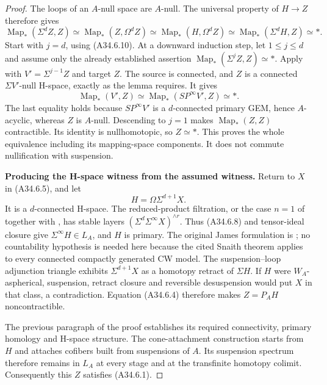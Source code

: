 \begin{proof}
The loops of an $A$-null space are $A$-null.  The universal
property of $H\to Z$ therefore gives
\[
 \operatorname{Map}_*(\Sigma^dZ,Z)
 \simeq\operatorname{Map}_*(Z,\Omega^dZ)
 \simeq\operatorname{Map}_*(H,\Omega^dZ)
 \simeq\operatorname{Map}_*(\Sigma^dH,Z)
 \simeq *.
 \tag{A34.6.10}
\]
Start with $j=d$, using \textup{(A34.6.10)}.  At a downward
induction step, let $1\leq j\leq d$ and assume only the already
established assertion
$\operatorname{Map}_*(\Sigma^jZ,Z)\simeq *$.  Apply \citet[Key Lemma~1.6]{ABousfield1996} with
$V'=\Sigma^{j-1}Z$ and target $Z$.
The source is connected, and $Z$ is a connected
$\Sigma V'$-null H-space, exactly as the lemma requires.
It gives
\[
 \operatorname{Map}_*(V',Z)
 \simeq\operatorname{Map}_*(SP^\infty V',Z)
 \simeq *.
 \tag{A34.6.11}
\]
The last equality holds because $SP^\infty V'$ is a
$d$-connected primary GEM, hence $A$-acyclic, whereas $Z$
is $A$-null.  Descending to $j=1$ makes
$\operatorname{Map}_*(Z,Z)$ contractible.  Its identity is
nullhomotopic, so $Z\simeq *$.  This proves the whole equivalence
including its mapping-space components.  It does not commute
nullification with suspension.

\par\medskip\noindent\textbf{Producing the H-space witness from the assumed witness.}\quad
Return to $X$ in \textup{(A34.6.5)}, and let
\[
                         H=\Omega\Sigma^{d+1}X.
 \tag{A34.6.12}
\]
It is a $d$-connected H-space.  The reduced-product filtration,
or the case $n=1$ of \citet[Theorem~1.1]{ASnaith} together
with \citet[Corollary~6.2]{A3May1972}, has stable layers $(\Sigma^d\Sigma^\infty X)^{\wedge r}$.
Thus \textup{(A34.6.8)} and tensor-ideal closure give
$\Sigma^\infty H\in L_A$, and $H$ is primary.
The original James formulation is
\citet[Section~1 and Theorem~5.6]{A4James1955}; no countability
hypothesis is needed here because the cited Snaith theorem
applies to every connected compactly generated CW model.
The suspension--loop adjunction triangle exhibits
$\Sigma^{d+1}X$ as a homotopy retract of $\Sigma H$.
If $H$ were $W_A$-aspherical, suspension, retract closure and
reversible desuspension would put $X$ in that class, a
contradiction.  Equation \textup{(A34.6.4)} therefore makes
$Z=P_AH$ noncontractible.

The previous paragraph of the proof establishes its required
connectivity, primary homology and H-space structure.
The cone-attachment construction starts from $H$ and attaches
cofibers built from suspensions of $A$.  Its suspension spectrum
therefore remains in $L_A$ at every stage and at the transfinite
homotopy colimit.  Consequently this $Z$ satisfies
\textup{(A34.6.1)}.


\end{proof}
